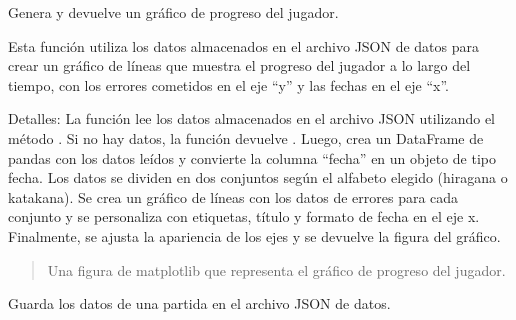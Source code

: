 \documentclass[letterpaper,10pt,spanish]{sphinxmanual}
\begin{document}
\begin{fulllineitems}
\begin{fulllineitems}
\end{fulllineitems}


\begin{fulllineitems}
\label{\detokenize{datos:datos.GestionDatos.generar_grafico}}
\pysigstartsignatures
{}
\pysigstopsignatures
\sphinxAtStartPar
Genera y devuelve un gráfico de progreso del jugador.

\sphinxAtStartPar
Esta función utiliza los datos almacenados en el archivo JSON de datos para
crear un gráfico de líneas que muestra el progreso del jugador a lo largo
del tiempo, con los errores cometidos en el eje “y” y las fechas en el eje “x”.

\sphinxAtStartPar
Detalles:
La función lee los datos almacenados en el archivo JSON utilizando el método
. Si no hay datos, la función devuelve . Luego, crea un DataFrame
de pandas con los datos leídos y convierte la columna “fecha” en un objeto de tipo
fecha. Los datos se dividen en dos conjuntos según el alfabeto elegido (hiragana o katakana).
Se crea un gráfico de líneas con los datos de errores para cada conjunto y se personaliza
con etiquetas, título y formato de fecha en el eje x. Finalmente, se ajusta la apariencia
de los ejes y se devuelve la figura del gráfico.
\begin{quote}\begin{description}
\sphinxAtStartPar
Una figura de matplotlib que representa el gráfico de progreso del jugador.

\end{description}\end{quote}

\end{fulllineitems}


\begin{fulllineitems}
\label{\detokenize{datos:datos.GestionDatos.guardar}}
\pysigstartsignatures
{}
\pysigstopsignatures
\sphinxAtStartPar
Guarda los datos de una partida en el archivo JSON de datos.


\end{fulllineitems}
\end{fulllineitems}
\end{document}
